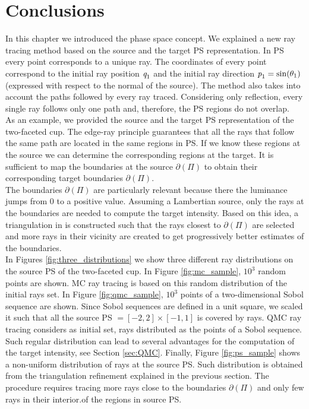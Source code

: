 \section{Conclusions}
In this chapter we introduced the phase space concept. 
We explained a new ray tracing method based on the source and the target PS representation. 
In PS every point corresponds to a unique ray. 
The coordinates of every point correspond to the initial ray position $\textit{q}_1$ and the initial ray direction $\textit{p}_1 = \sin(\theta_1)$ (expressed with respect to the normal of the source). The method also takes into account the paths followed by every ray traced.
Considering only reflection, every single ray follows only one path and, therefore, the PS regions do not overlap. 
\\ \indent
As an example, we provided the source and the target PS representation of the two-faceted cup.
The edge-ray principle guarantees that all the rays that follow the same path are located in the same regions in PS. If we know these regions at the source we can determine the corresponding regions at the target. 
It is sufficient to map the boundaries at the source $\partial$$(\Pi)$ to obtain their corresponding target boundaries $\partial$$(\Pi)$. \\ \indent
The boundaries $\partial$$(\Pi)$ are particularly relevant because there the luminance jumps from $0$ to a positive value. 
Assuming a Lambertian source, only the rays at the boundaries are needed to compute the target intensity. 
Based on this idea, a triangulation in  is constructed such that the rays closest to $\partial$$(\Pi)$
are selected and more rays in their vicinity are created to get progressively better estimates of the boundaries.
\\ \indent In Figures \ref{fig:three_distributions} we show three different ray distributions on the source PS of the two-faceted cup. In Figure \ref{fig:mc_sample}, $10^3$ random points are shown. MC ray tracing is based on this random distribution of the initial rays set. In Figure \ref{fig:qmc_sample}, $10^3$ points of a two-dimensional Sobol sequence are shown. 
Since Sobol sequences are defined in a unit square, we scaled it such that all the source PS $=[-2, 2]\times[-1, 1]$ is covered by rays. QMC ray tracing considers as initial set, rays distributed as the points of a Sobol sequence. Such regular distribution can lead to several advantages for the computation of the target intensity, see Section \ref{sec:QMC}. Finally, Figure \ref{fig:ps_sample} shows a non-uniform distribution of rays at the source PS. Such distribution is obtained from the triangulation refinement explained in the previous section. The procedure requires tracing more rays close to the boundaries $\partial$$(\Pi)$ and only few rays in their interior.of the regions in source PS. 
